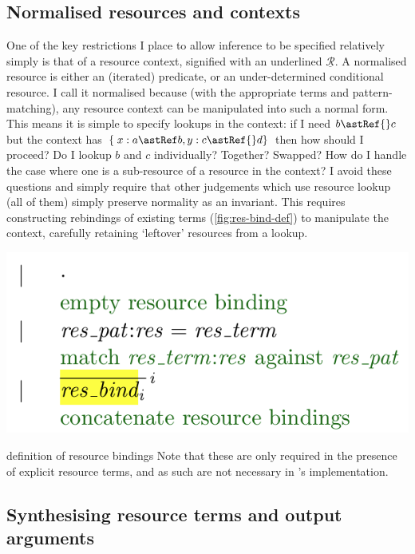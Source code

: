 \subsection{Normalised resources and contexts}

One of the key restrictions I place to allow inference to be specified
relatively simply is that of a  resource context, signified
with an underlined $\underline{\mathcal{R}}$. A normalised resource is either
an (iterated) predicate, or an under-determined conditional resource. I call it
normalised because (with the appropriate terms and pattern-matching), any
resource context can be manipulated into such a normal form. This means it is
simple to specify lookups in the context: if I need $b \astRef{} c$ but the
context has $\{\; x : a \astRef b , y : c \astRef{} d \}$ then how should I
proceed? Do I lookup $b$ and $c$ individually? Together? Swapped? How do I
handle the case where one is a sub-resource of a resource in the context? I
avoid these questions and simply require that other judgements which use
resource lookup (all of them) simply preserve normality as an invariant. This
requires constructing rebindings of existing terms (\cref{fig:res-bind-def}) to
manipulate the context, carefully retaining `leftover' resources from a lookup.

\begin{marginfigure}
    \includegraphics{figures/kernel-res-bind-def}
    \caption{ definition of resource bindings Note that these are
        only required in the presence of explicit resource terms, and as such
        are not necessary in 's implementation.}\label{fig:res-bind-def}
\end{marginfigure}

\subsection{Synthesising resource terms and output arguments}

